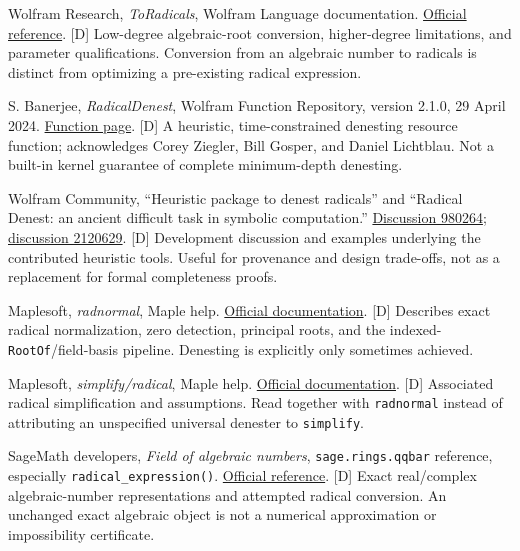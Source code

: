 \documentclass[11pt,a4paper]{article}
\numberwithin{equation}{section}
\theoremstyle{definition}\newtheorem{definition}[theorem]{Definition}
\theoremstyle{remark}\newtheorem{remark}[theorem]{Remark}
\newcommand{\access}[2]{\href{#1}{#2}}
\newcommand{\status}[1]{\textsf{\footnotesize[#1]}}
\begin{document}
\begin{thebibliography}{99}
 Wolfram Research, \emph{ToRadicals}, Wolfram Language documentation.
\access{https://reference.wolfram.com/language/ref/ToRadicals.html}{Official reference}. \status{D}
Low-degree algebraic-root conversion, higher-degree limitations, and parameter qualifications. Conversion from an algebraic number to radicals is distinct from optimizing a pre-existing radical expression.

 S. Banerjee, \emph{RadicalDenest}, Wolfram Function Repository, version 2.1.0, 29 April 2024.
\access{https://resources.wolframcloud.com/FunctionRepository/resources/RadicalDenest}{Function page}. \status{D}
A heuristic, time-constrained denesting resource function; acknowledges Corey Ziegler, Bill Gosper, and Daniel Lichtblau. Not a built-in kernel guarantee of complete minimum-depth denesting.

 Wolfram Community, ``Heuristic package to denest radicals'' and ``Radical Denest: an ancient difficult task in symbolic computation.''
\access{https://community.wolfram.com/groups/-/m/t/980264}{Discussion 980264};
\access{https://community.wolfram.com/groups/-/m/t/2120629}{discussion 2120629}. \status{D}
Development discussion and examples underlying the contributed heuristic tools. Useful for provenance and design trade-offs, not as a replacement for formal completeness proofs.

 Maplesoft, \emph{radnormal}, Maple help.
\access{https://www.maplesoft.com/support/help/Maple/view.aspx?path=radnormal}{Official documentation}. \status{D}
Describes exact radical normalization, zero detection, principal roots, and the indexed-\texttt{RootOf}/field-basis pipeline. Denesting is explicitly only sometimes achieved.

 Maplesoft, \emph{simplify/radical}, Maple help.
\access{https://www.maplesoft.com/support/help/Maple/view.aspx?path=simplify\%2Fradical}{Official documentation}. \status{D}
Associated radical simplification and assumptions. Read together with \texttt{radnormal} instead of attributing an unspecified universal denester to \texttt{simplify}.

 SageMath developers, \emph{Field of algebraic numbers}, \texttt{sage.rings.qqbar} reference, especially \texttt{radical\_expression()}.
\access{https://doc.sagemath.org/html/en/reference/number_fields/sage/rings/qqbar.html}{Official reference}. \status{D}
Exact real/complex algebraic-number representations and attempted radical conversion. An unchanged exact algebraic object is not a numerical approximation or impossibility certificate.


\end{thebibliography}
\end{document}
